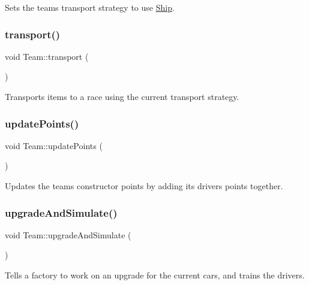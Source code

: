 Sets the team\textquotesingle{}s transport strategy to use \hyperlink{classShip}{Ship}. \mbox{\label{classTeam_a21681f514dea00fe6bca432ef64eab1e}} 
\subsubsection{\texorpdfstring{transport()}{transport()}}
{\footnotesize\ttfamily void Team\+::transport (\begin{DoxyParamCaption}{ }\end{DoxyParamCaption})}

Transports items to a race using the current transport strategy. \mbox{\label{classTeam_a013d81d7848893aef82a0e701b26777c}} 
\subsubsection{\texorpdfstring{update\+Points()}{updatePoints()}}
{\footnotesize\ttfamily void Team\+::update\+Points (\begin{DoxyParamCaption}{ }\end{DoxyParamCaption})}

Updates the team\textquotesingle{}s constructor points by adding its drivers\textquotesingle{} points together. \mbox{\label{classTeam_adc73729b63d1a52595c60f9e29d6e429}} 
\subsubsection{\texorpdfstring{upgrade\+And\+Simulate()}{upgradeAndSimulate()}}
{\footnotesize\ttfamily void Team\+::upgrade\+And\+Simulate (\begin{DoxyParamCaption}{ }\end{DoxyParamCaption})}

Tells a factory to work on an upgrade for the current cars, and trains the drivers. \mbox{\label{classTeam_aedf4b8a3cd9edb5349b2b1d7dd965a2f}} 
